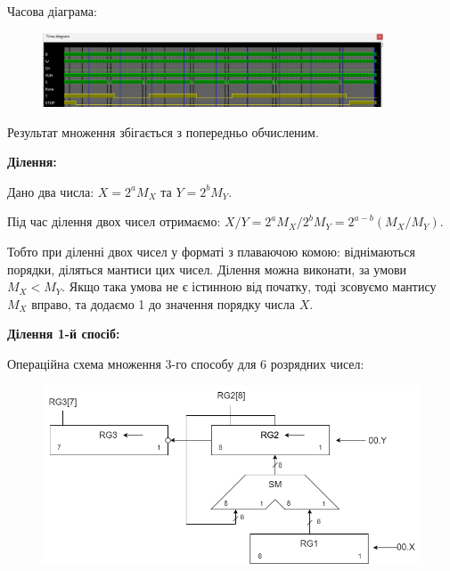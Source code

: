 \documentclass[12pt,a4paper]{article}
\begin{document}
    Часова діаграма:

    \begin{figure}[ht]
        \includegraphics[width=0.9\textwidth]{time2.png}
    \end{figure}

    Результат множення збігається з попередньо обчисленим.

    \newpage

    \textbf{\Large Ділення:}

    \vspace{1em}


    \setlength{\parindent}{1.5em}

    \vspace{1em}

    Дано два числа: $X = 2^a M_X$ та $Y = 2^b M_Y$.

    Під час ділення двох чисел отримаємо: $X \slash Y = 2^a M_X \slash 2^b M_Y = 2^{a - b} \left( M_X \slash M_Y \right)$.

    Тобто при діленні двох чисел у форматі з плаваючою комою: віднімаються порядки, діляться мантиси цих чисел.
    Ділення можна виконати, за умови $M_X < M_Y$.
    Якщо така умова не є істинною від початку, тоді зсовуємо мантису $M_X$ вправо, та додаємо 1 до значення порядку числа $X$.

    \vspace{1em}
    \setlength{\parindent}{0pt}

    \textbf{\large Ділення 1-й спосіб:}

    \vspace{1em}

    Операційна схема множення 3-го способу для 6 розрядних чисел:

    \begin{figure}[ht]
        \includegraphics[width=1.0\textwidth]{division1_operation_schemma.png}
    \end{figure}
\end{document}
